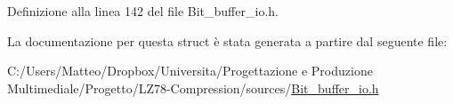 Definizione alla linea 142 del file Bit\-\_\-buffer\-\_\-io.\-h.



La documentazione per questa struct è stata generata a partire dal seguente file\-:\begin{DoxyCompactItemize}
\item 
C\-:/\-Users/\-Matteo/\-Dropbox/\-Universita/\-Progettazione e Produzione Multimediale/\-Progetto/\-L\-Z78-\/\-Compression/sources/\hyperlink{_bit__buffer__io_8h}{Bit\-\_\-buffer\-\_\-io.\-h}\end{DoxyCompactItemize}
